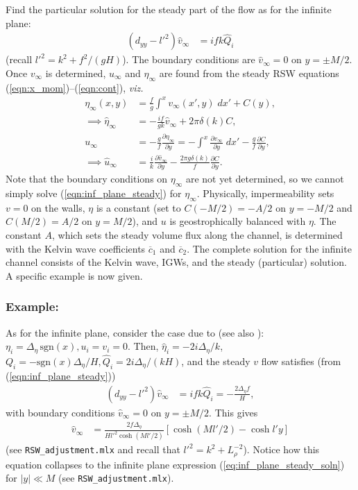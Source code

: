 \documentclass[10pt,reqno]{amsart}
\newcommand{\sign}{\mathrm{sgn}}
\begin{document}
Find the particular solution for the steady part of the flow as for the infinite plane:
\begin{align}
\left( d_{yy} - l'^2 \right) \hat{v}_{\infty}  & = i f k \hat{Q}_i   
\end{align}
(recall $l'^2 = k^2 + f^2/(gH)$).
The boundary conditions are $\hat{v}_\infty = 0$ on $y = \pm M/2$.
Once $v_\infty$ is determined, $u_\infty$ and $\eta_\infty$ are found from the steady RSW equations (\ref{eqn:x_mom})--(\ref{eqn:cont}), \textit{viz.}
\begin{align}
\eta_\infty (x,y) & = \frac{f}{g} \int^x v_\infty (x',y) \; dx' + C(y) , \label{eqn:channel_eta_infty} \\
\implies \hat{\eta}_\infty & = - \frac{i f}{g k } \hat{v}_\infty + 2 \pi \delta (k) C , \\
u_\infty & = -\frac{g}{f} \frac{\partial \eta_\infty}{\partial y}  = - \int^x \frac{\partial v_\infty}{\partial y} \; dx' - \frac{g}{f} \frac{\partial C}{\partial y} , \\
\implies \hat{u}_\infty & = \frac{i}{k} \frac{\partial \hat{v}_\infty}{\partial y} - \frac{2 \pi g \delta(k) }{f} \frac{\partial C}{\partial y} .
\end{align}
Note that the boundary conditions on $\eta_\infty$ are not yet determined, so we cannot simply solve (\ref{eqn:inf_plane_steady}) for $\eta_\infty$.
Physically, impermeability sets $v=0$ on the walls, $\eta$ is a constant (set to $C(-M/2) = -A/2$ on $y=-M/2$ and $C(M/2) = A/2$ on $y=M/2$), and $u$ is geostrophically balanced with $\eta$.
The constant $A$, which sets the steady volume flux along the channel, is determined with the Kelvin wave coefficients $\overline{c}_1$ and $\overline{c}_2$.
The complete solution for the infinite channel consists of the Kelvin wave, IGWs, and the steady (particular) solution.
A specific example is now given.

\subsubsection*{Example:}
As for the infinite plane, consider the case due to \citet{gill76, gill82} (see also \citealt{wajsowicz&gill86}): $\eta_i = \Delta_\eta \, \sign (x), u_i = v_i = 0$.
Then, $\hat{\eta}_i = -2 i \Delta_\eta / k$, $Q_i = -\sign (x) \Delta_\eta / H, \hat{Q}_i = 2 i \Delta_\eta / (k H)$, and the steady $v$ flow satisfies (from (\ref{eqn:inf_plane_steady}))
\begin{align}
\left( d_{yy} - l'^2 \right)
\hat{v}_{\infty} & = i f k \hat{Q}_i = 
- \frac{2 \Delta_\eta f}{H} ,   
\end{align}
with boundary conditions $\hat{v}_\infty = 0$ on $y = \pm M/2$.
This gives
\begin{align}
\hat{v}_{\infty}& = 
\frac{2 f \Delta_\eta }{ H l'^2 \cosh\left( M l' / 2 \right)} \left[\cosh \left( M l' / 2 \right) - \cosh l' y \right]
\label{eqn:channel_eg_v_h_inf}
\end{align}
(see \texttt{RSW\_adjustment.mlx} and recall that $l'^2 = k^2 + L_\rho^{-2}$).
Notice how this equation collapses to the infinite plane expression (\ref{eq:inf_plane_steady_soln}) for $|y| \ll M$ (see \texttt{RSW\_adjustment.mlx}).
\end{document}
